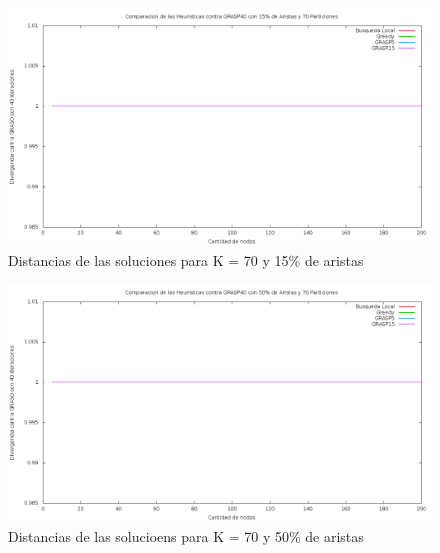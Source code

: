 \begin{figure}[H]
\begin{center}
\includegraphics[scale=0.3]{finales/muchosComparacionesCon70Particiones15Aristas.png}
\caption{Distancias de las soluciones para K = 70 y 15\% de aristas}
\end{center}
\end{figure}

\begin{figure}[H]
\begin{center}
\includegraphics[scale=0.3]{finales/muchosComparacionesCon70Particiones50Aristas.png}
\caption{Distancias de las solucioens para K = 70 y 50\% de aristas}
\end{center}
\end{figure}

